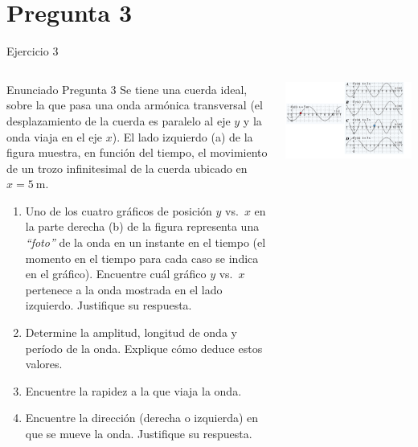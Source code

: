 \documentclass[
    10pt,
    aspectratio=169,
    xcolor={dvipsnames},
    spanish,
    ]{beamer}
\begin{document}
\section{Pregunta 3}
\begin{frame}{Ejercicio 3}
  \footnotesize
  \begin{columns}[T,totalwidth=\textwidth]
    \begin{column}{0.58\textwidth}
      \begin{block}{Enunciado Pregunta 3}
      Se tiene una cuerda ideal, sobre la que pasa una onda armónica transversal (el desplazamiento de la cuerda es paralelo al eje $y$ y la onda viaja en el eje $x$). El lado izquierdo (a) de la figura muestra, en función del tiempo, el movimiento de un trozo infinitesimal de la cuerda ubicado en $x=5~\text{m}$.

\begin{enumerate}
  \item Uno de los cuatro gráficos de posición $y$ vs.\ $x$ en la parte derecha (b) de la figura representa una \emph{“foto”} de la onda en un instante en el tiempo (el momento en el tiempo para cada caso se indica en el gráfico). Encuentre cuál gráfico $y$ vs.\ $x$ pertenece a la onda mostrada en el lado izquierdo. Justifique su respuesta.

  \item Determine la amplitud, longitud de onda y período de la onda. Explique cómo deduce estos valores.

  \item Encuentre la rapidez a la que viaja la onda.

  \item Encuentre la dirección (derecha o izquierda) en que se mueve la onda. Justifique su respuesta.
\end{enumerate}
      \end{block}
    \end{column}
    \begin{column}{0.40\textwidth}
      \centering
  \vspace*{1cm}
      \includegraphics[width=1.3\textwidth]{Auxiliar_2_12.png}
    \end{column}
  \end{columns}
\end{frame}
\end{document}
